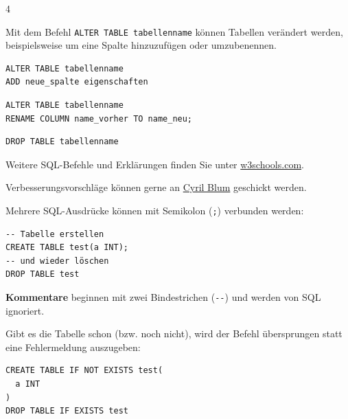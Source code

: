 \begin{landscape}
\begin{multicols*}{4}
\begin{cheatSheetBox}[title=Tabellen ändern: \texorpdfstring{\lstinline|ALTER|}{ALTER}]
Mit dem Befehl \lstinline|ALTER TABLE tabellenname| können Tabellen verändert werden, beispielsweise um eine Spalte hinzuzufügen oder umzubenennen.
\begin{lstlisting}
ALTER TABLE tabellenname
ADD neue_spalte eigenschaften
\end{lstlisting}
\begin{lstlisting}
ALTER TABLE tabellenname
RENAME COLUMN name_vorher TO name_neu;
\end{lstlisting}

\end{cheatSheetBox}

\begin{cheatSheetBox}[title=Tabellen löschen: \texorpdfstring{\lstinline|DROP TABLE|}{DROP TABLE}]
\begin{lstlisting}
DROP TABLE tabellenname
\end{lstlisting}
\end{cheatSheetBox}

\begin{cheatSheetBox}[title=Weitere Befehle \& Feedback]
Weitere \acrshort{SQL}-Befehle und Erklärungen finden Sie unter \href{https://www.w3schools.com/sql/default.asp}{w3schools.com}.

Verbesserungsvorschläge können gerne an \href{mailto:cyril.blum@edu.zh.ch}{Cyril Blum} geschickt werden.
\end{cheatSheetBox}

\begin{cheatSheetBox}[title=Mehrere Ausdrücke verbinden]
Mehrere SQL-Ausdrücke können mit Semikolon (\texttt{;}) verbunden werden:
\begin{lstlisting}
-- Tabelle erstellen
CREATE TABLE test(a INT);
-- und wieder löschen
DROP TABLE test
\end{lstlisting}
\textbf{Kommentare} beginnen mit zwei Bindestrichen (\lstinline|--|) und werden von SQL ignoriert.
\end{cheatSheetBox}

\begin{cheatSheetBox}[title={Überprüfen, ob existiert: \texorpdfstring{\lstinline|IF EXISTS|}{IF EXISTS}}]
Gibt es die Tabelle schon (bzw. noch nicht), wird der Befehl übersprungen statt eine Fehlermeldung auszugeben:
\begin{lstlisting}
CREATE TABLE IF NOT EXISTS test(
  a INT
)
DROP TABLE IF EXISTS test
\end{lstlisting}
\end{cheatSheetBox}


\end{multicols*}
\end{landscape}
